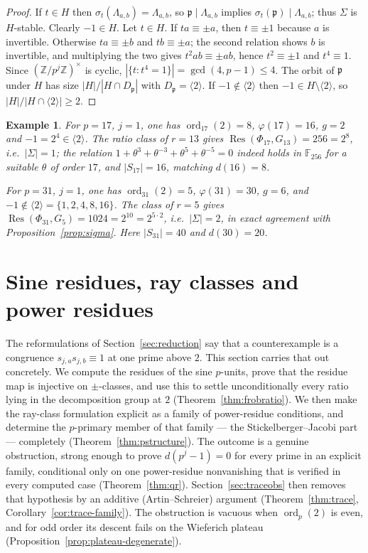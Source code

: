 \documentclass[a4paper]{article}
\newtheorem{example}[theorem]{Example}
\newcommand{\F}{\mathbb{F}}
\newcommand{\Z}{\mathbb{Z}}
\newcommand{\ord}[2][]{\operatorname{ord}_{#1}\!\left(#2\right)}
\newcommand{\abs}[1]{\left|#1\right|}
\DeclareMathOperator{\Res}{Res}
\begin{document}
\begin{proof}
	If $t\in H$ then $\sigma_t(\Lambda_{a,b})=\Lambda_{a,b}$, so
	$\mathfrak{p}\mid\Lambda_{a,b}$ implies
	$\sigma_t(\mathfrak{p})\mid\Lambda_{a,b}$; thus $\Sigma$ is
	$H$-stable.
	Clearly $-1\in H$.
	Let $t\in H$.
	If $ta\equiv\pm a$, then $t\equiv\pm1$ because $a$ is invertible.
	Otherwise $ta\equiv\pm b$ and $tb\equiv\pm a$; the second relation
	shows $b$ is invertible, and multiplying the two gives
	$t^{2}ab\equiv\pm ab$, hence $t^{2}\equiv\pm1$ and $t^{4}\equiv1$.
	Since $(\Z/p^j\Z)^{\times}$ is cyclic,
	$\abs{\{t:t^4=1\}}=\gcd(4,p-1)\leq4$.
	The orbit of $\mathfrak{p}$ under $H$ has size
	$\abs{H}/\abs{H\cap D_{\mathfrak{p}}}$ with
	$D_{\mathfrak{p}}=\langle2\rangle$.
	If $-1\notin\langle2\rangle$ then $-1\in H\setminus\langle2\rangle$, so
	$\abs{H}/\abs{H\cap\langle2\rangle}\geq2$.
\end{proof}

\begin{example}
	For $p=17$, $j=1$, one has $\ord[17]{2}=8$, $\varphi(17)=16$, $g=2$
	and $-1=2^{4}\in\langle2\rangle$.
	The ratio class of $r=13$ gives
	$\Res(\Phi_{17},G_{13})=256=2^{8}$, i.e.\
	$\abs{\Sigma}=1$; the relation
	$1+\theta^{3}+\theta^{-3}+\theta^{5}+\theta^{-5}=0$ indeed holds in
	$\F_{256}$ for a suitable $\theta$ of order $17$, and $\abs{S_{17}}=16$,
	matching $d(16)=8$.

	For $p=31$, $j=1$, one has $\ord[31]{2}=5$, $\varphi(31)=30$, $g=6$,
	and $-1\notin\langle2\rangle=\{1,2,4,8,16\}$.
	The class of $r=5$ gives $\Res(\Phi_{31},G_5)=1024=2^{10}=2^{5\cdot2}$,
	i.e.\ $\abs{\Sigma}=2$, in exact agreement with
	Proposition~\ref{prop:sigma}.
	Here $\abs{S_{31}}=40$ and $d(30)=20$.
\end{example}

\section{Sine residues, ray classes and power residues}\label{sec:power}

The reformulations of Section~\ref{sec:reduction} say that a counterexample
is a congruence $s_{j,a}s_{j,b}\equiv1$ at one prime above $2$.
This section carries that out concretely.
We compute the residues of the sine $p$-units, prove that the residue map is
injective on $\pm$-classes, and use this to settle unconditionally every
ratio lying in the decomposition group at $2$
(Theorem~\ref{thm:frobratio}).
We then make the ray-class formulation explicit as a family of power-residue
conditions, and determine the $p$-primary member of that family --- the
Stickelberger--Jacobi part --- completely
(Theorem~\ref{thm:pstructure}).
The outcome is a genuine obstruction, strong enough to prove
$d(p^{j}-1)=0$ for every prime in an explicit family, conditional only
on one power-residue nonvanishing that is verified in every computed case
(Theorem~\ref{thm:qr}).  Section~\ref{sec:traceobs} then removes that
hypothesis by an additive (Artin--Schreier) argument
(Theorem~\ref{thm:trace}, Corollary~\ref{cor:trace-family}).
The obstruction is vacuous when $\ord[p]{2}$ is
even, and for odd order its descent fails on the Wieferich plateau
(Proposition~\ref{prop:plateau-degenerate}).
\end{document}
